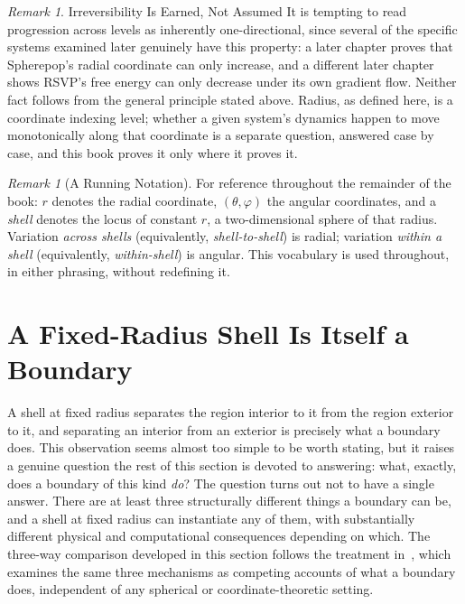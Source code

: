 \documentclass[11pt,fleqn]{book}
\numberwithin{equation}{chapter}
\theoremstyle{plain}
\theoremstyle{definition}
\theoremstyle{remark}
\newtheorem{remark}[theorem]{Remark}
\begin{document}
\begin{remark}{Irreversibility Is Earned, Not Assumed}
It is tempting to read progression across levels as inherently one-directional, since several of the specific systems examined later genuinely have this property: a later chapter proves that Spherepop's radial coordinate can only increase, and a different later chapter shows RSVP's free energy can only decrease under its own gradient flow. Neither fact follows from the general principle stated above. Radius, as defined here, is a coordinate indexing level; whether a given system's dynamics happen to move monotonically along that coordinate is a separate question, answered case by case, and this book proves it only where it proves it.
\end{remark}

\begin{remark}[A Running Notation]
For reference throughout the remainder of the book: \(r\) denotes the radial coordinate, \((\theta,\varphi)\) the angular coordinates, and a \emph{shell} denotes the locus of constant \(r\), a two-dimensional sphere of that radius. Variation \emph{across shells} (equivalently, \emph{shell-to-shell}) is radial; variation \emph{within a shell} (equivalently, \emph{within-shell}) is angular. This vocabulary is used throughout, in either phrasing, without redefining it.
\end{remark}

\section{A Fixed-Radius Shell Is Itself a Boundary}

A shell at fixed radius separates the region interior to it from the region exterior to it, and separating an interior from an exterior is precisely what a boundary does. This observation seems almost too simple to be worth stating, but it raises a genuine question the rest of this section is devoted to answering: what, exactly, does a boundary of this kind \emph{do}? The question turns out not to have a single answer. There are at least three structurally different things a boundary can be, and a shell at fixed radius can instantiate any of them, with substantially different physical and computational consequences depending on which. The three-way comparison developed in this section follows the treatment in~\cite{boundaries}, which examines the same three mechanisms as competing accounts of what a boundary does, independent of any spherical or coordinate-theoretic setting.
\end{document}

